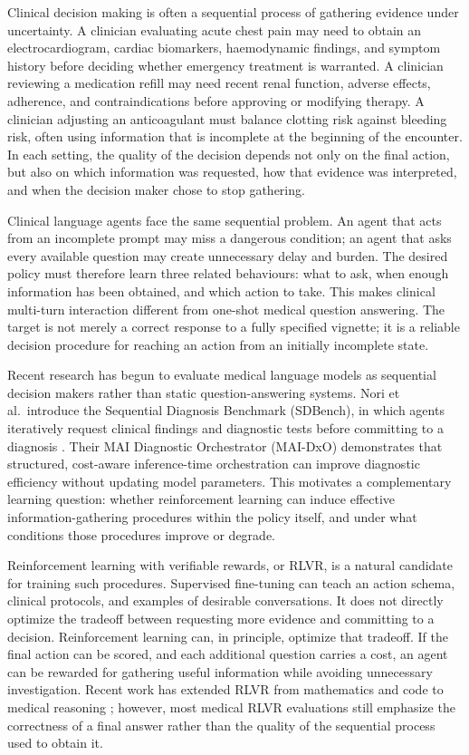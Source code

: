 \documentclass{article}
\begin{document}
Clinical decision making is often a sequential process of gathering evidence under
uncertainty. A clinician evaluating acute chest pain may need to obtain an
electrocardiogram, cardiac biomarkers, haemodynamic findings, and symptom history
before deciding whether emergency treatment is warranted. A clinician reviewing a
medication refill may need recent renal function, adverse effects, adherence, and
contraindications before approving or modifying therapy. A clinician adjusting an
anticoagulant must balance clotting risk against bleeding risk, often using information
that is incomplete at the beginning of the encounter. In each setting, the quality of
the decision depends not only on the final action, but also on which information was
requested, how that evidence was interpreted, and when the decision maker chose to
stop gathering.

Clinical language agents face the same sequential problem. An agent that acts from
an incomplete prompt may miss a dangerous condition; an agent that asks every
available question may create unnecessary delay and burden. The desired policy must
therefore learn three related behaviours: what to ask, when enough information has
been obtained, and which action to take. This makes clinical multi-turn interaction
different from one-shot medical question answering. The target is not merely a
correct response to a fully specified vignette; it is a reliable decision procedure
for reaching an action from an initially incomplete state.

Recent research has begun to evaluate medical language models as
sequential decision makers rather than static question-answering
systems. Nori et al.\ introduce the Sequential Diagnosis Benchmark
(SDBench), in which agents iteratively request clinical findings and
diagnostic tests before committing to a diagnosis
\citep{nori2025sequential}. Their MAI Diagnostic Orchestrator (MAI-DxO)
demonstrates that structured, cost-aware inference-time orchestration
can improve diagnostic efficiency without updating model parameters.
This motivates a complementary learning question: whether reinforcement
learning can induce effective information-gathering procedures within
the policy itself, and under what conditions those procedures improve
or degrade.

Reinforcement learning with verifiable rewards, or RLVR, is a natural candidate for
training such procedures. Supervised fine-tuning can teach an action schema,
clinical protocols, and examples of desirable conversations. It does not directly
optimize the tradeoff between requesting more evidence and committing to a decision.
Reinforcement learning can, in principle, optimize that tradeoff. If the final action
can be scored, and each additional question carries a cost, an agent can be rewarded
for gathering useful information while avoiding unnecessary investigation. Recent
work has extended RLVR from mathematics and code to medical reasoning
\citep{chen2024huatuogpto1, zhang2025medrlvr, lin2025ehrmind}; however, most
medical RLVR evaluations still emphasize the correctness of a final answer rather
than the quality of the sequential process used to obtain it.
\end{document}
